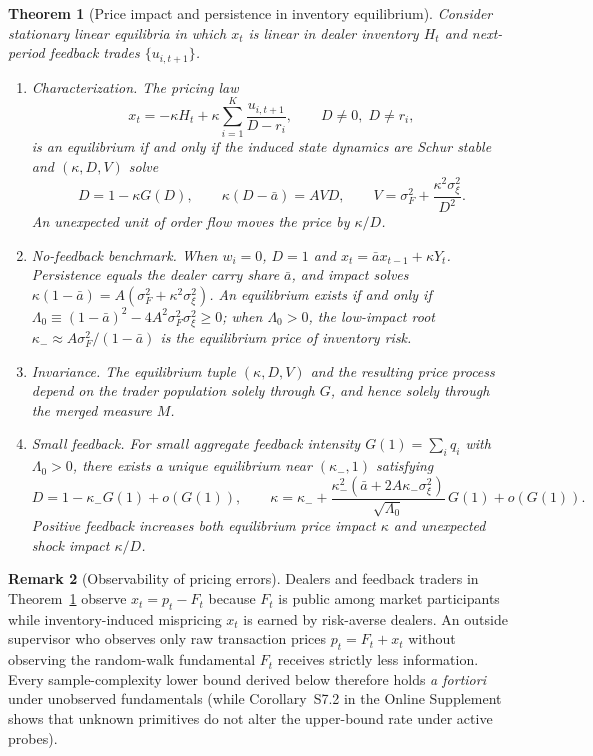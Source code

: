 \documentclass[11pt,letterpaper]{article}
\newtheorem{theorem}{Theorem}[section]
\theoremstyle{definition}
\newtheorem{remark}[theorem]{Remark}
\begin{document}
\begin{theorem}[Price impact and persistence in inventory equilibrium]\label{thm:inv-eq}
Consider stationary linear equilibria in which $x_t$ is linear in dealer inventory $H_t$ and next-period feedback trades $\{u_{i,t+1}\}$.
\begin{enumerate}
  \item[(i)] \emph{Characterization.} The pricing law
  \[
    x_t = -\kappa H_t + \kappa \sum_{i=1}^K \frac{u_{i,t+1}}{D - r_i}, \qquad D \neq 0, \; D \neq r_i,
  \]
  is an equilibrium if and only if the induced state dynamics are Schur stable and $(\kappa, D, V)$ solve
  \begin{equation}\label{eq:eq-system}
    D = 1 - \kappa G(D), \qquad \kappa(D - \bar{a}) = A V D, \qquad V = \sigma_F^2 + \frac{\kappa^2 \sigma_\xi^2}{D^2}.
  \end{equation}
  An unexpected unit of order flow moves the price by $\kappa / D$.
  \item[(ii)] \emph{No-feedback benchmark.} When $w_i = 0$, $D = 1$ and $x_t = \bar{a} x_{t-1} + \kappa Y_t$. Persistence equals the dealer carry share $\bar{a}$, and impact solves $\kappa(1 - \bar{a}) = A(\sigma_F^2 + \kappa^2 \sigma_\xi^2)$. An equilibrium exists if and only if $\Lambda_0 \equiv (1 - \bar{a})^2 - 4 A^2 \sigma_F^2 \sigma_\xi^2 \ge 0$; when $\Lambda_0 > 0$, the low-impact root $\kappa_- \approx A \sigma_F^2 / (1 - \bar{a})$ is the equilibrium price of inventory risk.
  \item[(iii)] \emph{Invariance.} The equilibrium tuple $(\kappa, D, V)$ and the resulting price process depend on the trader population solely through $G$, and hence solely through the merged measure $M$.
  \item[(iv)] \emph{Small feedback.} For small aggregate feedback intensity $G(1) = \sum_i q_i$ with $\Lambda_0 > 0$, there exists a unique equilibrium near $(\kappa_-, 1)$ satisfying
  \[
    D = 1 - \kappa_- G(1) + o(G(1)), \qquad
    \kappa = \kappa_- + \frac{\kappa_-^2(\bar{a} + 2 A \kappa_- \sigma_\xi^2)}{\sqrt{\Lambda_0}}\, G(1) + o(G(1)).
  \]
  Positive feedback increases both equilibrium price impact $\kappa$ and unexpected shock impact $\kappa / D$.
\end{enumerate}
\end{theorem}

\begin{remark}[Observability of pricing errors]\label{rem:obs}
Dealers and feedback traders in Theorem~\ref{thm:inv-eq} observe $x_t = p_t - F_t$ because $F_t$ is public among market participants while inventory-induced mispricing $x_t$ is earned by risk-averse dealers. An outside supervisor who observes only raw transaction prices $p_t = F_t + x_t$ without observing the random-walk fundamental $F_t$ receives strictly less information. Every sample-complexity lower bound derived below therefore holds \emph{a fortiori} under unobserved fundamentals (while Corollary~S7.2 in the Online Supplement shows that unknown primitives do not alter the upper-bound rate under active probes).
\end{remark}
\end{document}
